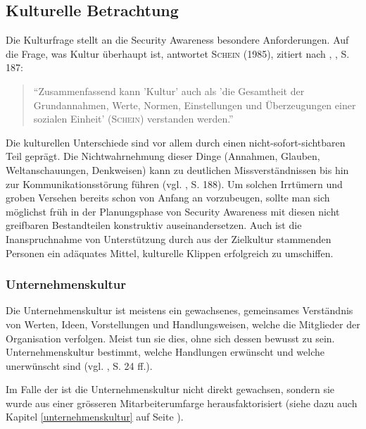 \documentclass[../../main.tex]{subfiles}
\begin{document}
\subsection{Kulturelle Betrachtung}

\begin{sloppypar}
Die Kulturfrage stellt an die Security Awareness besondere Anforderungen. Auf die Frage, was Kultur überhaupt ist, antwortet \textsc{Schein} (1985), zitiert nach \citeauthor{helisch_security_2009}, \citeyear{helisch_security_2009}, S. 187:

\begin{quote}
"`Zusammenfassend kann 'Kultur' auch als 'die Gesamtheit der Grundannahmen, Werte, Normen, Einstellungen und Überzeugungen einer sozialen Einheit' (\textsc{Schein}) verstanden werden."'
\end{quote}

Die kulturellen Unterschiede sind vor allem durch einen nicht-sofort-sichtbaren Teil geprägt. Die Nichtwahrnehmung dieser Dinge (Annahmen, Glauben, Weltanschauungen, Denkweisen) kann zu deutlichen Missverständnissen bis hin zur Kommunikationsstörung führen (vgl. \citeauthor{helisch_security_2009} \citeyear{helisch_security_2009}, S. 188). Um solchen Irrtümern und groben Versehen bereits schon von Anfang an vorzubeugen, sollte man sich möglichst früh in der Planungsphase von Security Awareness mit diesen nicht greifbaren Bestandteilen konstruktiv auseinandersetzen. Auch ist die Inanspruchnahme von Unterstützung durch aus der Zielkultur stammenden Personen ein adäquates Mittel, kulturelle Klippen erfolgreich zu umschiffen.
\end{sloppypar}

\subsubsection{Unternehmenskultur}

\begin{sloppypar}
Die Unternehmenskultur ist meistens ein gewachsenes, gemeinsames Verständnis von Werten, Ideen, Vorstellungen und Handlungsweisen, welche die Mitglieder der Organisation verfolgen. Meist tun sie dies, ohne sich dessen bewusst zu sein. Unternehmenskultur bestimmt, welche Handlungen erwünscht und welche unerwünscht sind (vgl. \citeauthor{helisch_security_2009} \citeyear{helisch_security_2009}, S. 24 ff.).

Im Falle der \companyshort ist die Unternehmenskultur nicht direkt gewachsen, sondern sie wurde aus einer grösseren Mitarbeiterumfarge herausfaktorisiert (siehe dazu auch Kapitel \ref{unternehmenskultur} auf Seite \pageref{unternehmenskultur}). 
\end{sloppypar}
\end{document}
